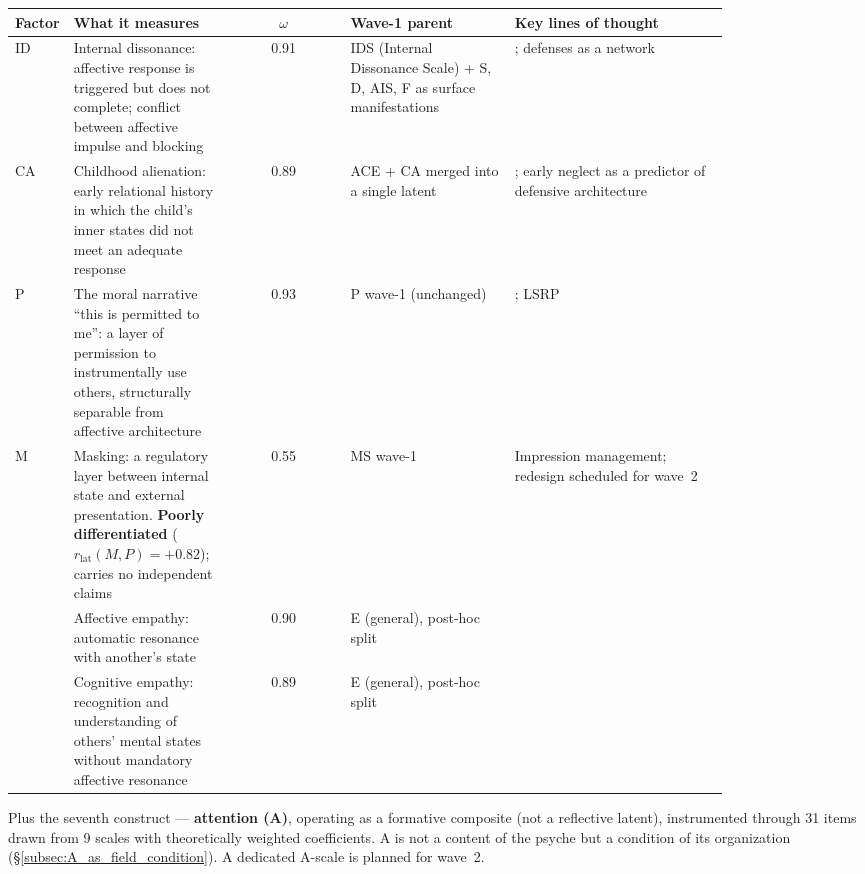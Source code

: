 \begin{center}
\small
\begin{tabular}{p{0.08\linewidth}p{0.22\linewidth}cp{0.23\linewidth}p{0.30\linewidth}}
\toprule
\textbf{Factor} & \textbf{What it measures} & \boldmath$\omega$ & \textbf{Wave-1 parent} & \textbf{Key lines of thought} \\
\midrule
ID & Internal dissonance: affective response is triggered but does not complete; conflict between affective impulse and blocking & 0.91 & IDS (Internal Dissonance Scale) + S, D, AIS, F as surface manifestations & \citet{ferenczi1933, klein1946, fonagy2002}; defenses as a network \citep{digiuseppe2024} \\
\midrule
CA & Childhood alienation: early relational history in which the child's inner states did not meet an adequate response & 0.89 & ACE + CA merged into a single latent & \citet{bowlby1969, main1986, fonagy2002}; early neglect as a predictor of defensive architecture \\
\midrule
P & The moral narrative ``this is permitted to me'': a layer of permission to instrumentally use others, structurally separable from affective architecture & 0.93 & P wave-1 (unchanged) & \citet{cleckley1941, hare1991, blair2013, baroncohen2011}; LSRP \citep{levenson1995} \\
\midrule
M & Masking: a regulatory layer between internal state and external presentation. \textbf{Poorly differentiated} ($r_{\mathrm{lat}}(M, P) = +0.82$); carries no independent claims & 0.55 & MS wave-1 & Impression management; redesign scheduled for wave~2 \\
\midrule
\EAF{} & Affective empathy: automatic resonance with another's state & 0.90 & E (general), post-hoc split & \citet{davis1983, shamaytsoory2011, decety2011} \\
\midrule
\Ecog{} & Cognitive empathy: recognition and understanding of others' mental states without mandatory affective resonance & 0.89 & E (general), post-hoc split & \citet{baroncohen2011, shamaytsoory2011} \\
\bottomrule
\end{tabular}
\end{center}

Plus the seventh construct --- \textbf{attention (A)}, operating as a formative composite (not a reflective latent), instrumented through 31 items drawn from 9 scales with theoretically weighted coefficients. A is not a content of the psyche but a condition of its organization (§\ref{subsec:A_as_field_condition}). A dedicated A-scale is planned for wave~2.

